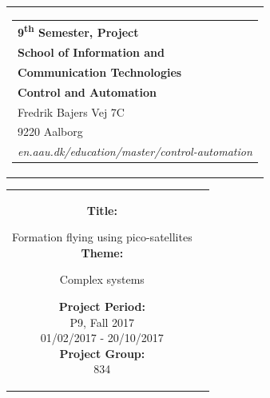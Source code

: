 % 
\begin{nopagebreak}
{\samepage 

\begin{tabular}{r}
\parbox{\textwidth}{  
\hfill \hspace{2cm} \parbox{8cm}{\begin{tabular}{l} %
{\small \textbf{\textcolor{aaublue}{\colorbox{white}{9\textsuperscript{th} Semester, Project}}}}\\
{\small \textbf{\textcolor{aaublue}{School of Information and}}}\\
{\small \textbf{\textcolor{aaublue}{Communication Technologies}}}\\ 
{\small \textbf{\textcolor{aaublue}{Control and Automation}}}\\
{\small \textcolor{aaublue}{Fredrik Bajers Vej 7C}} \\
{\small \textcolor{aaublue}{9220 Aalborg}} \\
{\small \textcolor{aaublue}{\emph{en.aau.dk/education/master/control-automation}}}
\end{tabular}}}
\end{tabular}

\begin{tabular}{cc}
\parbox{7cm}{

\textbf{Title:}

Formation flying using pico-satellites\\ %

\textbf{Theme:}

\small{
 Complex systems\\
}


\parbox{8cm}{


\textbf{Project Period:}\\
P9, Fall 2017\\
01/02/2017 - 20/10/2017\\
   
\textbf{Project Group:}\\
834\\ %
  
}}
\end{tabular}}
\end{nopagebreak}
